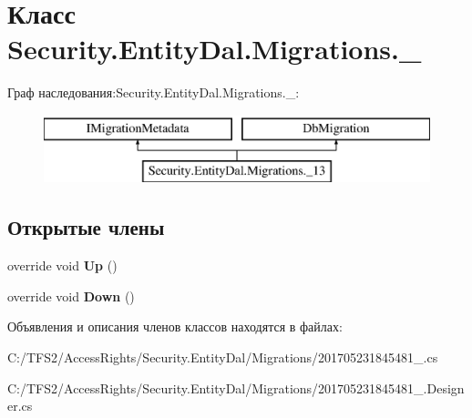 \hypertarget{class_security_1_1_entity_dal_1_1_migrations_1_1__13}{}\section{Класс Security.\+Entity\+Dal.\+Migrations.\+\_}
\label{class_security_1_1_entity_dal_1_1_migrations_1_1__13}
Граф наследования\+:Security.\+Entity\+Dal.\+Migrations.\+\_\+:\begin{figure}[H]
\begin{center}
\leavevmode
\includegraphics[height=2.000000cm]{d6/d77/class_security_1_1_entity_dal_1_1_migrations_1_1__13}
\end{center}
\end{figure}
\subsection*{Открытые члены}
\begin{DoxyCompactItemize}
\item 
\mbox{\label{class_security_1_1_entity_dal_1_1_migrations_1_1__13_ad2335a6f34aa54f09615382fa1b328b5}} 
override void {\bfseries Up} ()
\item 
\mbox{\label{class_security_1_1_entity_dal_1_1_migrations_1_1__13_a173a117d9fc6804a98fdda9466c290e6}} 
override void {\bfseries Down} ()
\end{DoxyCompactItemize}


Объявления и описания членов классов находятся в файлах\+:\begin{DoxyCompactItemize}
\item 
C\+:/\+T\+F\+S2/\+Access\+Rights/\+Security.\+Entity\+Dal/\+Migrations/201705231845481\+\_.\+cs\item 
C\+:/\+T\+F\+S2/\+Access\+Rights/\+Security.\+Entity\+Dal/\+Migrations/201705231845481\+\_.\+Designer.\+cs\end{DoxyCompactItemize}

